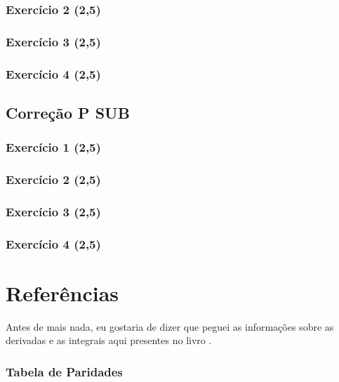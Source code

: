 \documentclass[12pt,openany, letterpaper]{book}
\newcommand{\E}[1]{Exercício #1}
\begin{document}
{{\newpage

\section*{\E{2} (2,5)}

\newpage

\section*{\E{3} (2,5)}

\newpage

\section*{\E{4} (2,5)}

\chapter{Correção P SUB}
\label{C:SUB}

\section*{\E{1} (2,5)}

\newpage

\section*{\E{2} (2,5)}


\section*{\E{3} (2,5)}

\newpage

\section*{\E{4} (2,5)}

\part{Referências}

Antes de mais nada, eu gostaria de dizer que peguei as informações sobre as derivadas e as integrais aqui presentes no livro \cite[p.p. 199-201]{referencia}. 

\section*{Tabela de Paridades}

}}
\end{document}
